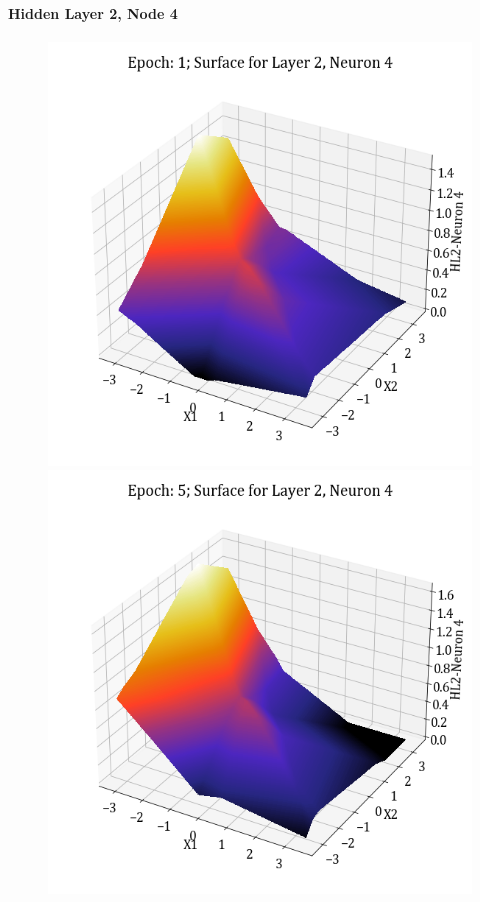\documentclass[11pt,a4paper]{article}
\begin{document}
\paragraph{Hidden Layer 2, Node 4}
\begin{figure}[H]
    \centering
    \includegraphics[scale=0.4]{images/1B_MLFFNN_E1_HL2_N4.png}
    \includegraphics[scale=0.4]{images/1B_MLFFNN_E5_HL2_N4.png}

\end{figure}
\end{document}
